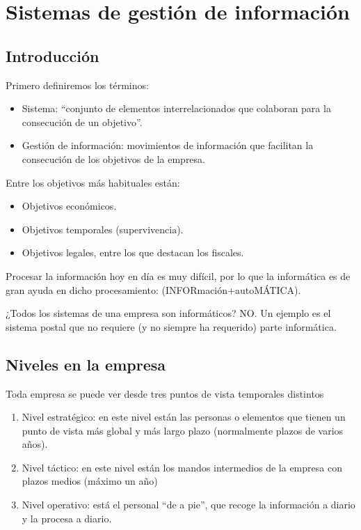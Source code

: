 \documentclass[letterpaper,10pt,spanish]{sphinxmanual}
\begin{document}
\chapter{Sistemas de gestión de información}
\label{tema8::doc}\label{tema8:sistemas-de-gestion-de-informacion}

\section{Introducción}
\label{tema8:introduccion}
Primero definiremos los términos:
\begin{itemize}
\item {} 
Sistema: ``conjunto de elementos interrelacionados que colaboran para la consecución de un objetivo''.

\item {} 
Gestión de información: movimientos de información que facilitan la consecución de los objetivos de la empresa.

\end{itemize}

Entre los objetivos más habituales están:
\begin{itemize}
\item {} 
Objetivos económicos.

\item {} 
Objetivos temporales (supervivencia).

\item {} 
Objetivos legales, entre los que destacan los fiscales.

\end{itemize}

Procesar la información hoy en día es muy difícil, por lo que la informática es de gran ayuda en dicho procesamiento: (INFORmación+autoMÁTICA).

¿Todos los sistemas de una empresa son informáticos? NO. Un ejemplo es el sistema postal que no requiere (y no siempre ha requerido) parte informática.


\section{Niveles en la empresa}
\label{tema8:niveles-en-la-empresa}
Toda empresa se puede ver desde tres puntos de vista temporales distintos
\begin{enumerate}
\item {} 
Nivel estratégico: en este nivel están las personas o elementos que tienen un punto de vista más global y más largo plazo (normalmente plazos de varios años).

\item {} 
Nivel táctico: en este nivel están los mandos intermedios de la empresa con plazos medios (máximo un año)

\item {} 
Nivel operativo: está el personal ``de a pie'', que recoge la información a diario y la procesa a diario.

\end{enumerate}
\end{document}
